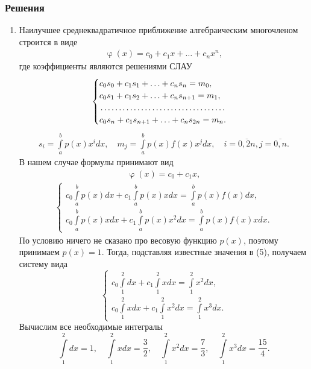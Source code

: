 \documentclass[a4paper, 12pt]{article}
\renewcommand{\varphi}{\upvarphi}
\begin{document}
	\subsubsection*{Решения}
	\begin{enumerate}
		\item \hypertarget{t1}{}
		Наилучшее среднеквадратичное приближение алгебраическим многочленом строится в виде \begin{eqnarray}
			\varphi(x) = c_0 + c_1x + \ldots +c_nx^n,
		\end{eqnarray} где коэффициенты являются решениями СЛАУ
		\begin{eqnarray}
			\begin{cases}
				c_0s_0 + c_1s_1 + \ldots + c_ns_n = m_0,\\
				c_0s_1 + c_1s_2 + \ldots + c_ns_{n+1} = m_1,\\
				\dotfill\\
				c_0s_n + c_1s_{n+1} + \ldots + c_ns_{2n} = m_n.
			\end{cases}
		\end{eqnarray}
		\begin{eqnarray}
			s_i = \int\limits_a^b p(x) x^i dx,\quad m_j= \int\limits_a^b p(x) f(x) x^j dx,\quad i=\overline{0,2n}, j=\overline{0,n}.
		\end{eqnarray}
		В нашем случае формулы принимают вид \begin{eqnarray}
			\varphi(x) = c_0 + c_1x,
		\end{eqnarray}
		\begin{eqnarray}
			\begin{cases}
				c_0\int\limits_a^b p(x) dx+ c_1\int\limits_a^b p(x) x dx= \int\limits_a^b p(x)f(x)dx,\\
				c_0\int\limits_a^b p(x)x dx+ c_1\int\limits_a^b p(x) x^2 dx= \int\limits_a^b p(x)f(x)xdx.
			\end{cases}
		\end{eqnarray}
		По условию ничего не сказано про весовую функцию $p(x)$, поэтому принимаем $p(x) = 1$. Тогда, подставляя известные значения в (5), получаем систему вида 
		$$\begin{cases}
			c_0\int\limits_1^2  dx+ c_1\int\limits_1^2 x dx= \int\limits_1^2 x^2dx,\\
			c_0\int\limits_1^2 x dx+ c_1\int\limits_1^2 x^2 dx= \int\limits_1^2 x^3dx.
		\end{cases}$$
		Вычислим все необходимые интегралы $$\int\limits_1^2  dx = 1,\quad \int\limits_1^2 xdx = \dfrac32,\quad \int\limits_1^2 x^2 dx = \dfrac73,\quad \int\limits_1^2 x^3 dx = \dfrac{15}{4}.$$

\end{enumerate}
\end{document}
